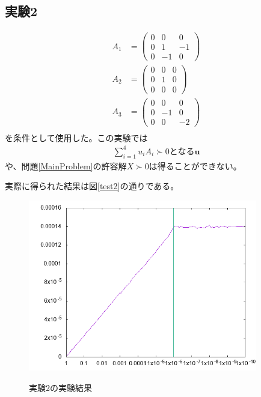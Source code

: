 \subsection{実験2}
\begin{align*}
  A_1 & = \left(
            \begin{array}{ccc}
              0 &  0 &  0 \\
              0 &  1 & -1 \\
              0 & -1 &  0
            \end{array}
          \right) \\
  A_2 & = \left(
            \begin{array}{ccc}
              0 & 0 & 0 \\
              0 & 1 & 0 \\
              0 & 0 & 0
            \end{array}
          \right) \\
  A_3 & = \left(
            \begin{array}{ccc}
              0 &  0 &  0 \\
              0 & -1 &  0 \\
              0 &  0 & -2
            \end{array}
          \right) \\
\end{align*}
を条件として使用した。この実験では
\begin{align*}
  \displaystyle{\sum_{i = 1}^4} u_i A_i \succ 0\text{となる}\mathbf{u}
\end{align*}
や、問題\ref{MainProblem}の許容解$X \succ 0$は得ることができない。

実際に得られた結果は図\ref{test2}の通りである。
\begin{figure}
  \centering
  \includegraphics[width=10cm]{test2.png}
  \label{test2-results}
  \caption{実験2の実験結果}
\end{figure}

